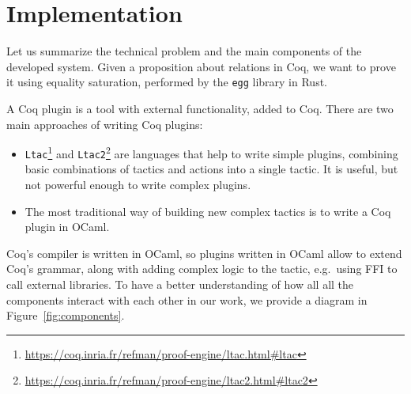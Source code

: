 \section{Implementation}
Let us summarize the technical problem and the main components of the developed system. Given a proposition about relations in Coq, we want to prove it using equality saturation, performed by the \texttt{egg} library in Rust. 

A Coq plugin is a tool with external functionality, added to Coq. There are two main approaches of writing Coq plugins: 
\begin{itemize}
    \item \texttt{Ltac}\footnote{\href{https://coq.inria.fr/refman/proof-engine/ltac.html\#ltac}{https://coq.inria.fr/refman/proof-engine/ltac.html\#ltac}} and \texttt{Ltac2}\footnote{\href{https://coq.inria.fr/refman/proof-engine/ltac2.html\#ltac2}{https://coq.inria.fr/refman/proof-engine/ltac2.html\#ltac2}} are languages that help to write simple plugins, combining basic combinations of tactics and actions into a single tactic. It is useful, but not powerful enough to write complex plugins.
    \item The most traditional way of building new complex tactics is to write a Coq plugin in OCaml.
\end{itemize}

Coq's compiler is written in OCaml, so plugins written in OCaml allow to extend Coq's grammar, along with adding complex logic to the tactic, e.g.\ using FFI to call external libraries. To have a better understanding of how all all the components interact with each other in our work, we provide a diagram in Figure~\ref{fig:components}.

